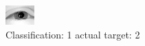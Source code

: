 \begin{figure}[h!]
\begin{center}
\includegraphics[width=0.60\columnwidth]{figures/ID2277_class_1_target_2.png}
\end{center}
\caption{ Classification: 1 actual target: 2}
\label{fig:ID2277_class_1_target_2}
\end{figure}
